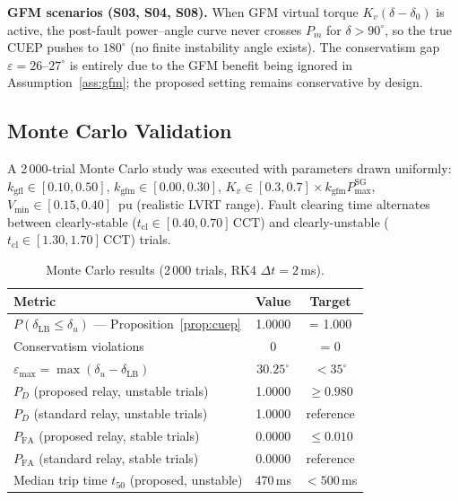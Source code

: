 \documentclass[11pt,a4paper]{article}
\newcommand{\dz}{\delta_0}         %
\newcommand{\du}{\delta_u}         %
\newcommand{\dlb}{\delta_{\mathrm{LB}}}   %
\begin{document}
\textbf{GFM scenarios (S03, S04, S08).}  When GFM virtual torque
$K_v (\delta - \dz)$ is active, the post-fault power--angle curve never
crosses $P_m$ for $\delta > 90^\circ$, so the true CUEP pushes to
$180^\circ$ (no finite instability angle exists).  The conservatism gap
$\varepsilon = 26$--$27^\circ$ is entirely due to the GFM benefit being
ignored in Assumption~\ref{ass:gfm}; the proposed setting remains conservative
by design.

\subsection{Monte Carlo Validation}
\label{sec:mc}

A 2\,000-trial Monte Carlo study was executed with parameters drawn uniformly:
$k_{\mathrm{gfl}} \in [0.10, 0.50]$, $k_{\mathrm{gfm}} \in [0.00, 0.30]$,
$K_v \in [0.3, 0.7] \times k_{\mathrm{gfm}} P_{\max}^{\mathrm{SG}}$,
$V_{\min} \in [0.15, 0.40]$~pu (realistic LVRT range).
Fault clearing time alternates between clearly-stable
($t_{\mathrm{cl}} \in [0.40, 0.70]\,\mathrm{CCT}$) and
clearly-unstable ($t_{\mathrm{cl}} \in [1.30, 1.70]\,\mathrm{CCT}$) trials.

\begin{table}[ht]
  \centering
  \caption{Monte Carlo results (2\,000 trials, RK4 $\Delta t = 2$\,ms).}
  \label{tab:mc}
  \begin{tabular}{lcc}
    \toprule
    Metric & Value & Target \\
    \midrule
    $P(\dlb \leq \du)$ --- Proposition~\ref{prop:cuep} & 1.0000 & = 1.000 \\
    Conservatism violations & 0 & = 0 \\
    $\varepsilon_{\max} = \max(\du - \dlb)$ & $30.25^\circ$ & $< 35^\circ$ \\
    \midrule
    $P_D$ (proposed relay, unstable trials) & 1.0000 & $\geq 0.980$ \\
    $P_D$ (standard relay, unstable trials) & 1.0000 & reference \\
    $P_{\mathrm{FA}}$ (proposed relay, stable trials) & 0.0000 & $\leq 0.010$ \\
    $P_{\mathrm{FA}}$ (standard relay, stable trials) & 0.0000 & reference \\
    Median trip time $t_{50}$ (proposed, unstable) & 470\,ms & $< 500$\,ms \\
    \bottomrule
  \end{tabular}
\end{table}
\end{document}
